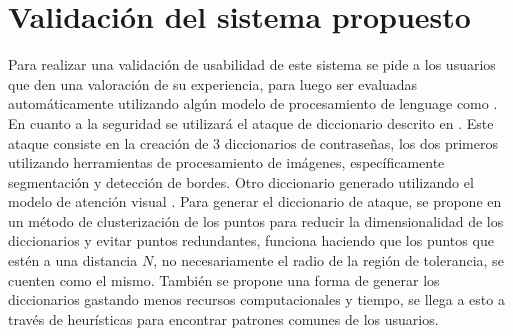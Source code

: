 \section{Validación del sistema propuesto}
Para realizar una validaci\'on de usabilidad de este sistema se pide a los usuarios que den una valoraci\'on de su experiencia, para luego ser evaluadas autom\'aticamente utilizando alg\'un modelo de procesamiento de lenguage como \cite{team2023gemini}. En cuanto a la seguridad se utilizar\'a el ataque de diccionario descrito en \cite{van2010purely}. Este ataque consiste en la creaci\'on de 3 diccionarios de contrase\~nas, los dos primeros utilizando herramientas de procesamiento de im\'agenes, espec\'ificamente segmentaci\'on y detecci\'on de bordes. Otro diccionario generado utilizando el modelo de atenci\'on visual \cite{itti2000saliency}. Para generar el diccionario de ataque, se propone en  \cite{van2010purely} un m\'etodo de clusterizaci\'on de los puntos para reducir la dimensionalidad de los diccionarios y evitar puntos redundantes, funciona haciendo que los puntos que est\'en a una distancia $N$, no necesariamente el radio de la regi\'on de tolerancia, se cuenten como el mismo. Tambi\'en se propone una forma de generar los diccionarios gastando menos recursos computacionales y tiempo, se llega a esto a trav\'es de heur\'isticas para encontrar patrones comunes de los usuarios. 


